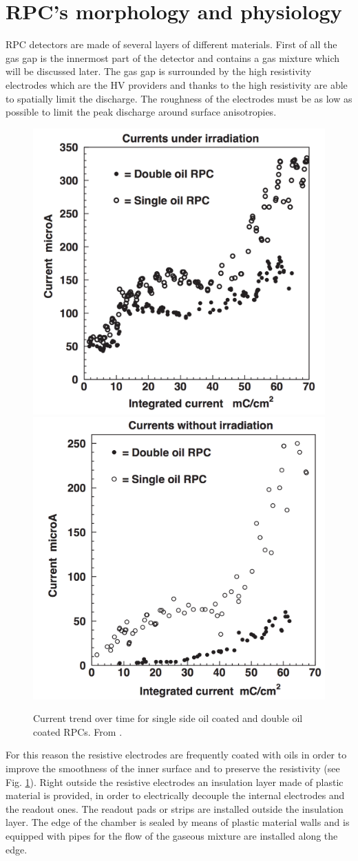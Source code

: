 \section{RPC's morphology and physiology}
RPC detectors are made of several layers of different materials.
First of all the gas gap is the innermost part of the detector and contains a gas mixture which will be discussed later.
The gas gap is surrounded by the high resistivity electrodes which are the HV providers and thanks to the high resistivity are able to spatially limit the discharge.
The roughness of the electrodes must be as low as possible to limit the peak discharge around surface anisotropies.


\begin{figure}[!t]
\begin{center}
\includegraphics[width=0.47\linewidth]{Chapters/Performance/Figs/oil_irradiation.png}
\includegraphics[width=0.47\linewidth]{Chapters/Performance/Figs/oil_no_irradiation.png}
\caption{Current trend over time for single side oil coated and double oil coated RPCs. From \cite{aliceRPC:2004}.}
\label{fig:RPCoil}
\end{center}
\end{figure}

For this reason the resistive electrodes are frequently coated with oils in order to improve the smoothness of the inner surface and to preserve the resistivity (see Fig. \ref{fig:RPCoil}).
Right outside the resistive electrodes an insulation layer made of plastic material is provided, in order to electrically decouple the internal electrodes and the readout ones.
The readout pads or strips are installed outside the insulation layer.
The edge of the chamber is sealed by means of plastic material walls and is equipped with pipes for the flow of the gaseous mixture are installed along the edge.

